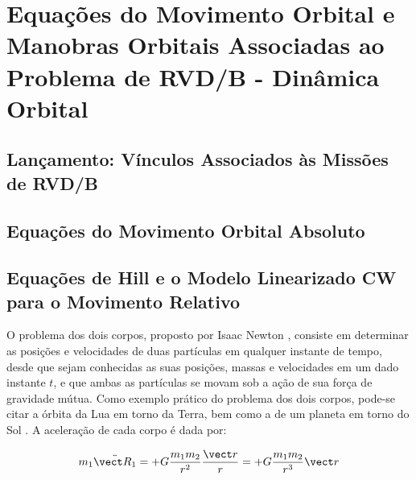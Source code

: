

\section{Equações do Movimento Orbital e Manobras Orbitais Associadas ao Problema de RVD/B - Dinâmica Orbital}


\subsection{Lançamento: Vínculos Associados às Missões de RVD/B}


\subsection{Equações do Movimento Orbital Absoluto}


\subsection{Equações de Hill e o Modelo Linearizado CW para o Movimento Relativo}



O problema dos dois corpos, proposto por Isaac Newton \cite{newton1713}, consiste em determinar as posições e velocidades de duas partículas em qualquer instante de tempo, desde que sejam conhecidas as suas posições, massas e velocidades em um dado instante $t$, e que ambas as partículas se movam sob a ação de sua força de gravidade mútua.  
Como exemplo prático do problema dos dois corpos, pode-se citar a órbita da Lua em torno da Terra, bem como a de um planeta em torno do Sol \cite{wgsantos2011}.
A aceleração de cada corpo é dada por:

\begin{equation}
\label{eq:aceleracao_Corpo1}
m_1 \ddot{\vect R_{1}} = + G \frac{m_1m_2}{r^2} \frac{\vect r}{r} = + G \frac{m_1m_2}{r^3} {\vect r}
\end{equation}

